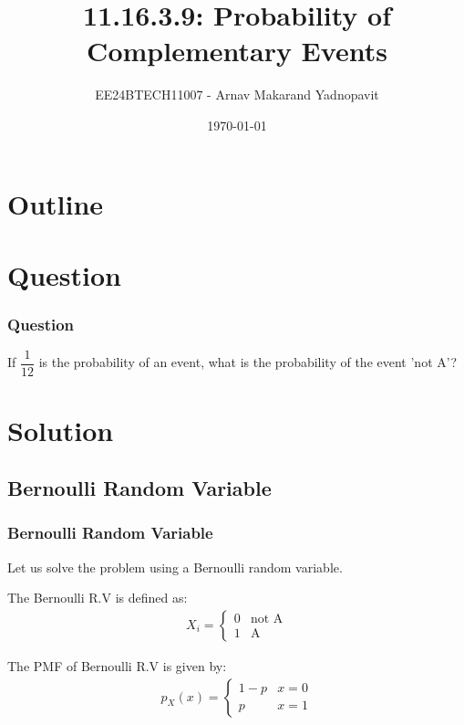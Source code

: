\documentclass{beamer}
\title{11.16.3.9: Probability of Complementary Events}
\author{EE24BTECH11007 - Arnav Makarand Yadnopavit}
\date{\today}
\numberwithin{equation}{section}
\begin{document}
\begin{frame}
\titlepage
\end{frame}

\section*{Outline}
\begin{frame}
\tableofcontents
\end{frame}

\section{Question}
\begin{frame}
\frametitle{Question}
If $\dfrac{1}{12}$ is the probability of an event, what is the probability of the event 'not A'?
\end{frame}

\section{Solution}
\subsection{Bernoulli Random Variable}
\begin{frame}
\frametitle{Bernoulli Random Variable}
Let us solve the problem using a Bernoulli random variable.

The Bernoulli R.V is defined as:
\begin{align}
	X_i = \begin{cases}
		0 & \text{not A}\\	
		1 & \text{A}	
	\end{cases}
\end{align}

The PMF of Bernoulli R.V is given by:
\begin{align}
  p_X(x) = \begin{cases}
    1-p & x = 0\\
    p & x = 1
  \end{cases}
\end{align}
\end{frame}
\end{document}
